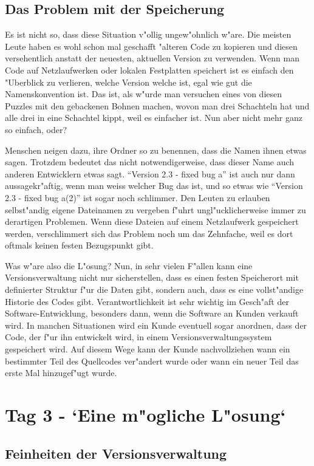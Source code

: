 \subsection{Das Problem mit der Speicherung}

Es ist nicht so, dass diese Situation v"ollig ungew"ohnlich w"are. Die meisten Leute haben es wohl schon mal geschafft "alteren Code zu kopieren und diesen
versehentlich anstatt der neuesten, aktuellen Version zu verwenden. Wenn man Code auf Netzlaufwerken oder lokalen Festplatten speichert ist es einfach den
"Uberblick zu verlieren, welche Version welche ist, egal wie gut die Namenskonvention ist. Das ist, als w"urde man versuchen eines von diesen Puzzles mit den
gebackenen Bohnen machen, wovon man drei Schachteln hat und alle drei in eine Schachtel kippt, weil es einfacher ist. Nun aber nicht mehr ganz so einfach, oder?

Menschen neigen dazu, ihre Ordner so zu benennen, dass die Namen ihnen etwas sagen. Trotzdem bedeutet das nicht notwendigerweise, dass dieser Name auch anderen
Entwicklern etwas sagt. ``Version 2.3 - fixed bug a'' ist auch nur dann aussagekr"aftig, wenn man weiss welcher Bug das ist, und so etwas wie ``Version 2.3 - fixed
bug a(2)'' ist sogar noch schlimmer. Den Leuten zu erlauben selbst"andig eigene Dateinamen zu vergeben f"uhrt ungl"ucklicherweise immer zu derartigen Problemen. Wenn
diese Dateien auf einem Netzlaufwerk gespeichert werden, verschlimmert sich das Problem noch um das Zehnfache, weil es dort oftmals keinen festen Bezugspunkt gibt.

Was w"are also die L"osung? Nun, in sehr vielen F"allen kann eine Versionsverwaltung nicht nur sicherstellen, dass es einen festen Speicherort mit definierter
Struktur f"ur die Daten gibt, sondern auch, dass es eine vollst"andige Historie des Codes gibt. Verantwortlichkeit ist sehr wichtig im Gesch"aft der
Software-Entwicklung, besonders dann, wenn die Software an Kunden verkauft wird. In manchen Situationen wird ein Kunde eventuell sogar anordnen, dass der Code, der
f"ur ihn entwickelt wird, in einem Versionsverwaltungssystem gespeichert wird. Auf diesem Wege kann der Kunde nachvollziehen wann ein bestimmter Teil des Quellcodes
ver"andert wurde oder wann ein neuer Teil das erste Mal hinzugef"ugt wurde.

\section{Tag 3 - `Eine m"ogliche L"osung`}
\subsection{Feinheiten der Versionsverwaltung}

